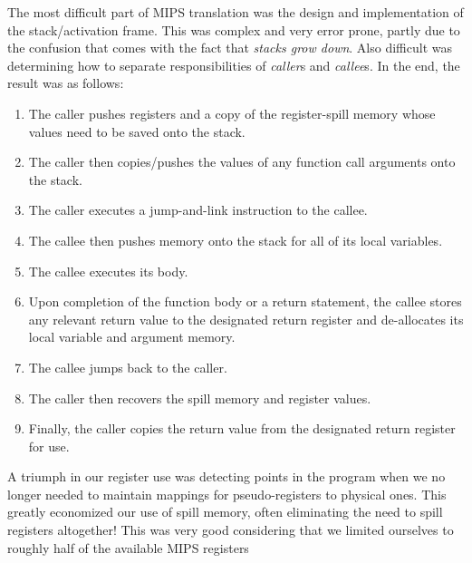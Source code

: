 \documentclass{article}
\begin{document}
\noindent The most difficult part of MIPS translation was the design and implementation
of the stack/activation frame. This was complex and very error prone, partly
due to the confusion that comes with the fact that \textit{stacks grow down}.
Also difficult was determining how to separate responsibilities of 
\textit{caller}s and \textit{callee}s. In the end, the result was as follows:
  \begin{enumerate}
  \item The caller pushes registers and a copy of the register-spill memory
        whose values need to be saved onto the stack.

  \item The caller then copies/pushes the values of any function call arguments
        onto the stack.

  \item The caller executes a jump-and-link instruction to the callee.

  \item The callee then pushes memory onto the stack for all of its local
        variables.

  \item The callee executes its body.

  \item Upon completion of the function body or a return statement, the callee
        stores any relevant return value to the designated return register
        and de-allocates its local variable and argument memory.

  \item The callee jumps back to the caller.

  \item The caller then recovers the spill memory and register values.

  \item Finally, the caller copies the return value from the designated return
        register for use.
  \end{enumerate}

\noindent A triumph in our register use was detecting points in the program when we no
longer needed to maintain mappings for pseudo-registers to physical ones. This
greatly economized our use of spill memory, often eliminating the need to spill
registers altogether! This was very good considering that we limited ourselves
to roughly half of the available MIPS registers
\end{document}
